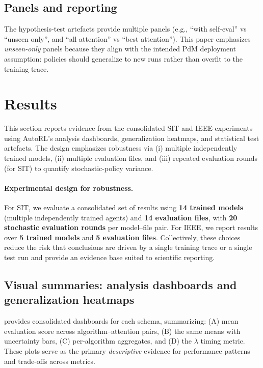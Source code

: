 \documentclass[11pt]{article}
\begin{document}
\subsection{Panels and reporting}
The hypothesis-test artefacts provide multiple panels (e.g., ``with self-eval'' vs ``unseen only'', and ``all attention'' vs ``best attention''). This paper emphasizes \emph{unseen-only} panels because they align with the intended PdM deployment assumption: policies should generalize to new runs rather than overfit to the training trace.

\section{Results}
\label{sec:results}
This section reports evidence from the consolidated SIT and IEEE experiments using AutoRL's analysis dashboards, generalization heatmaps, and statistical test artefacts. The design emphasizes robustness via (i) multiple independently trained models, (ii) multiple evaluation files, and (iii) repeated evaluation rounds (for SIT) to quantify stochastic-policy variance.

\paragraph{Experimental design for robustness.}
For SIT, we evaluate a consolidated set of results using \textbf{14 trained models} (multiple independently trained agents) and \textbf{14 evaluation files}, with \textbf{20 stochastic evaluation rounds} per model--file pair. For IEEE, we report results over \textbf{5 trained models} and \textbf{5 evaluation files}. Collectively, these choices reduce the risk that conclusions are driven by a single training trace or a single test run and provide an evidence base suited to scientific reporting.

\subsection{Visual summaries: analysis dashboards and generalization heatmaps}
 provides consolidated dashboards for each schema, summarizing: (A) mean evaluation score across algorithm--attention pairs, (B) the same means with uncertainty bars, (C) per-algorithm aggregates, and (D) the $\lambda$ timing metric. These plots serve as the primary \emph{descriptive} evidence for performance patterns and trade-offs across metrics.
\end{document}
